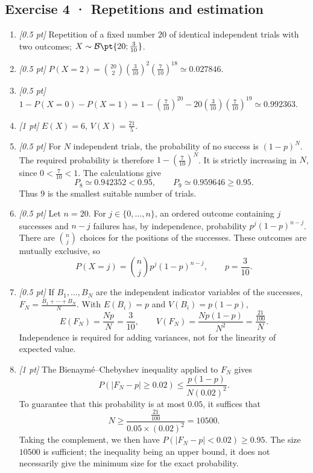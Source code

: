 \subsection*{Exercise 4 · Repetitions and estimation}\begin{enumerate}

\item \textit{[0.5 pt]} Repetition of a fixed number $20$ of identical independent trials with two outcomes; $X\sim\mathcal B\pt{20;\frac{3}{10}}$.

\item \textit{[0.5 pt]} $P(X=2)=\binom{20}2(\frac{3}{10})^2(\frac{7}{10})^{18}\simeq\num{0,027846}$.

\item \textit{[0.5 pt]} $1-P(X=0)-P(X=1)=1-(\frac{7}{10})^{20}-20(\frac{3}{10})(\frac{7}{10})^{19}\simeq\num{0,992363}$.

\item \textit{[1 pt]} $E(X)=6$, $V(X)=\frac{21}{5}$.

\item \textit{[0.5 pt]} For $N$ independent trials, the probability of no success is $(1-p)^N$. The required probability is therefore $1-(\frac{7}{10})^N$. It is strictly increasing in $N$, since $0<\frac{7}{10}<1$. The calculations give
\[P_{8}\simeq\num{0,942352}<\num{0,95},\qquad P_{9}\simeq\num{0,959646}\ge\num{0,95}.\]
Thus $9$ is the smallest suitable number of trials.

\item \textit{[0.5 pt]} Let $n=20$. For $j\in\{0,\ldots,n\}$, an ordered outcome containing $j$ successes and $n-j$ failures has, by independence, probability $p^j(1-p)^{n-j}$. There are $\binom nj$ choices for the positions of the successes. These outcomes are mutually exclusive, so
\[P(X=j)=\binom nj p^j(1-p)^{n-j},\qquad p=\frac{3}{10}.\]

\item \textit{[0.5 pt]} If $B_1,\ldots,B_N$ are the independent indicator variables of the successes, $F_N=\frac{B_1+\cdots+B_N}{N}$. With $E(B_i)=p$ and $V(B_i)=p(1-p)$,
\[E(F_N)=\frac{Np}{N}=\frac{3}{10},\qquad V(F_N)=\frac{Np(1-p)}{N^2}=\frac{\frac{21}{100}}{N}.\]
Independence is required for adding variances, not for the linearity of expected value.

\item \textit{[1 pt]} The Bienaymé–Chebyshev inequality applied to $F_N$ gives
\[P(|F_N-p|\ge\num{0,02})\le\frac{p(1-p)}{N(\num{0,02})^2}.\]
To guarantee that this probability is at most $\num{0,05}$, it suffices that
\[N\ge\frac{\frac{21}{100}}{\num{0,05}\times(\num{0,02})^2}=10500.\]
Taking the complement, we then have $P(|F_N-p|<\num{0,02})\ge\num{0,95}$. The size $10500$ is sufficient; the inequality being an upper bound, it does not necessarily give the minimum size for the exact probability.

\end{enumerate}

\fi

\fi

